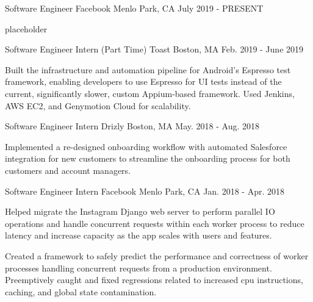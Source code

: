 
\begin{cventries}
  \cventry
    {Software Engineer} %
    {Facebook} %
    {Menlo Park, CA} %
    {July 2019 - PRESENT} %
    {
      \begin{cvitems} %
        \item {placeholder}
      \end{cvitems}
    }

  \cventry
    {Software Engineer Intern (Part Time)} %
    {Toast} %
    {Boston, MA} %
    {Feb. 2019 - June 2019} %
    {
      \begin{cvitems} %
        \item {Built the infrastructure and automation pipeline for Android's Espresso test framework, enabling developers to use Espresso for UI tests instead of the current, significantly slower, custom Appium-based framework. Used Jenkins, AWS EC2, and Genymotion Cloud for scalability.}
      \end{cvitems}
    }

  \cventry
    {Software Engineer Intern} %
    {Drizly} %
    {Boston, MA} %
    {May. 2018 - Aug. 2018} %
    {
      \begin{cvitems} %
        \item {Implemented a re-designed onboarding workflow with automated Salesforce integration for new customers to streamline the onboarding process for both customers and account managers.}
      \end{cvitems}
    }

  \cventry
    {Software Engineer Intern} %
    {Facebook} %
    {Menlo Park, CA} %
    {Jan. 2018 - Apr. 2018} %
    {
      \begin{cvitems} %
        \item {Helped migrate the Instagram Django web server to perform parallel IO operations and handle concurrent requests within each worker process to reduce latency and increase capacity as the app scales with users and features.}
		\item {Created a framework to safely predict the performance and correctness of worker processes handling concurrent requests from a production environment. Preemptively caught and fixed regressions related to increased cpu instructions, caching, and global state contamination.}
      \end{cvitems}
    }


\end{cventries}
